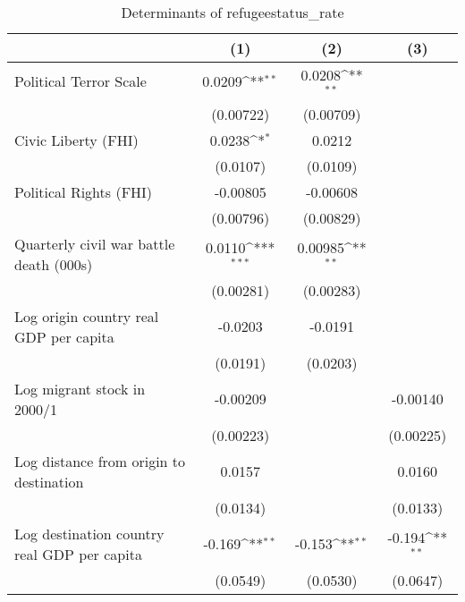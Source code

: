 \begin{table}[htbp]\centering
\def\sym#1{\ifmmode^{#1}\else\(^{#1}\)\fi}
\caption{Determinants of refugeestatus\_rate}
\begin{tabular}{l*{3}{c}}
\hline\hline
                    &\multicolumn{1}{c}{(1)}         &\multicolumn{1}{c}{(2)}         &\multicolumn{1}{c}{(3)}         \\
\hline
Political Terror Scale&      0.0209\sym{**} &      0.0208\sym{**} &                     \\
                    &   (0.00722)         &   (0.00709)         &                     \\
[1em]
Civic Liberty (FHI) &      0.0238\sym{*}  &      0.0212         &                     \\
                    &    (0.0107)         &    (0.0109)         &                     \\
[1em]
Political Rights (FHI)&    -0.00805         &    -0.00608         &                     \\
                    &   (0.00796)         &   (0.00829)         &                     \\
[1em]
Quarterly civil war battle death (000s)&      0.0110\sym{***}&     0.00985\sym{**} &                     \\
                    &   (0.00281)         &   (0.00283)         &                     \\
[1em]
Log origin country real GDP per capita&     -0.0203         &     -0.0191         &                     \\
                    &    (0.0191)         &    (0.0203)         &                     \\
[1em]
Log migrant stock in 2000/1&    -0.00209         &                     &    -0.00140         \\
                    &   (0.00223)         &                     &   (0.00225)         \\
[1em]
Log distance from origin to destination&      0.0157         &                     &      0.0160         \\
                    &    (0.0134)         &                     &    (0.0133)         \\
[1em]
Log destination country real GDP per capita&      -0.169\sym{**} &      -0.153\sym{**} &      -0.194\sym{**} \\
                    &    (0.0549)         &    (0.0530)         &    (0.0647)         \\

\end{tabular}
\end{table}
